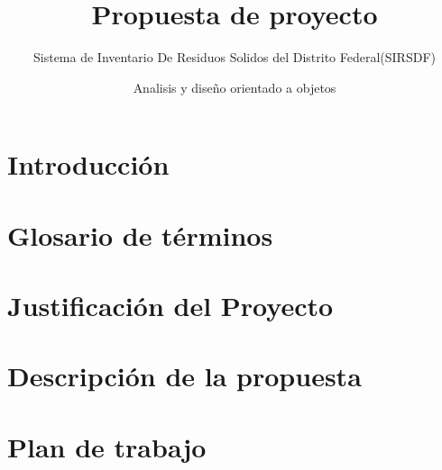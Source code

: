 \documentclass[10pt]{book}
\title{Propuesta de proyecto}
\subtitle{ Sistema de Inventario De Residuos Solidos del Distrito Federal(SIRSDF) }
\author{Analisis y diseño orientado a objetos}
\begin{document}
\maketitle
\thispagestyle{empty}

\frontmatter

\tableofcontents

\mainmatter
\chapter{Introducción}


\chapter{Glosario de términos}


\chapter{Justificación del Proyecto}


\chapter{Descripción de la propuesta}


\chapter{Plan de trabajo}


\end{document}
